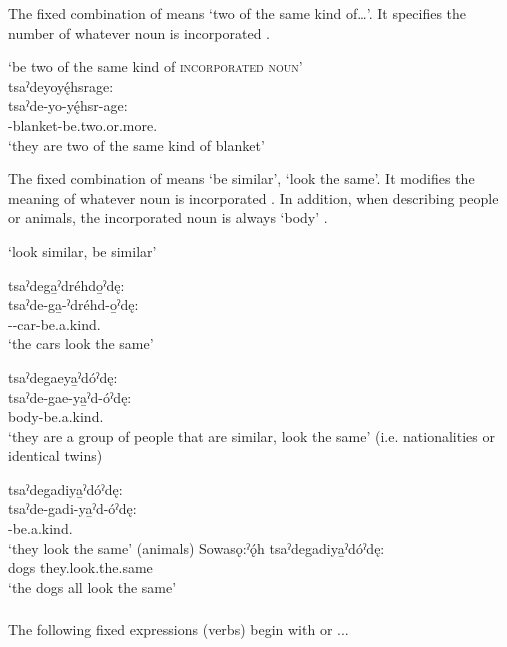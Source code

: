 The fixed combination of  means ‘two of the same kind of…’. It specifies the number of whatever noun is incorporated .

\ea\label{ex:pppexpressionex29}  ‘be two of the same kind of \textsc{incorporated noun}’\\
tsaˀdeyoyę́hsrage:\\
\gll tsaˀde-yo-yę́hsr-age:\\
{\coincidentdualic}-blanket-be.two.or.more.{\stative}\\
\glt `they are two of the same kind of blanket'
\z


The fixed combination of  means ‘be similar’, ‘look the same’. It modifies the meaning of whatever noun is incorporated . In addition, when describing people or animals, the incorporated noun is always  ‘body’ .

\ea\label{ex:pppexpressionex28}  ‘look similar, be similar’

\ea tsaˀdega̱ˀdréhdo̱ˀdę:\\ \label{ex:pppexpressionex28a}
\gll tsaˀde-ga̱-ˀdréhd-o̱ˀdę:\\
{\coincidentdualic}--car-be.a.kind.{\stative}\\
\glt `the cars look the same'

\ex tsaˀdegaeya̱ˀdóˀdę:\\ \label{ex:pppexpressionex28b}
\gll tsaˀde-gae-ya̱ˀd-óˀdę:\\
{\coincidentdualic}body-be.a.kind.{\stative}\\
\glt `they are a group of people that are similar, look the same' (i.e. nationalities or identical twins)

\ex tsaˀdegadiya̱ˀdóˀdę:\\ \label{ex:pppexpressionex28c}
\gll tsaˀde-gadi-ya̱ˀd-óˀdę:\\
{\coincidentdualic}-be.a.kind.{\stative}\\
\glt `they look the same' (animals)
\ex
\gll Sowasǫ:ˀǫ́h tsaˀdegadiya̱ˀdóˀdę:\\
dogs they.look.the.same\\
\glt  ‘the dogs all look the same’


\z
\z

\subsubsection*{} \label{[tsaˀdet/tsaˀdeg-verb]}
The following fixed expressions (verbs) begin with  or  \textsc{\coincident.\dualic.\cislocative}.

